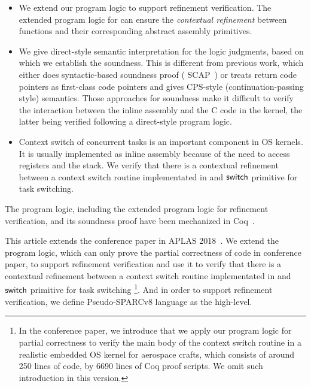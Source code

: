 \begin{itemize}
    \item
    We extend our program logic 
    to support refinement verification. 
    The extended program logic for \sparc{} can ensure 
    the {\it contextual refinement} between
    \sparc{} functions and their corresponding 
    abstract assembly primitives. 

    \item
    We give direct-style semantic interpretation for
    the logic judgments, based on which we establish the
    soundness. This is different from previous
    work, which either does syntactic-based soundness proof
    (\eg{} SCAP~\cite{Feng06pldi}) or treats return code pointers
    as first-class code pointers and gives CPS-style 
    (continuation-passing style) semantics.
    Those approaches for soundness make it difficult to verify
    the interaction between the inline assembly and the C
    code in the kernel, the latter being verified following
    a direct-style program logic.

    \item
	Context switch of concurrent tasks is an important
    component in OS kernels. It is usually implemented
    as inline assembly because of the need to access
    registers and the stack. 
    We verify that there is a contextual refinement 
    between a context switch routine implementated 
    in \sparc{} and $\mathsf{switch}$ primitive for task 
    switching. 


\end{itemize}
The program logic, including the extended program logic 
for refinement verification, and its soundness proof 
have been mechanized in Coq~\cite{coqimp}. 

This article extends the conference paper in 
APLAS 2018~\cite{zha18aplas}. We extend 
the program logic, which can only prove the partial 
correctness of \sparc{} code in conference paper, 
to support refinement verification and use it to  
verify that there is a contextual refinement between 
a context switch routine implementated 
in \sparc{} and $\mathsf{switch}$ primitive for task switching
\footnote{In the conference paper, 
    we introduce that we apply our program logic 
    for partial correctness to 
    verify the main body of the context switch routine
	in a realistic embedded OS kernel for aerospace crafts,
    which consists of around 250 lines of \sparc{} code, 
    by 6690 lines of Coq proof scripts. 
    We omit such introduction in this version.}. 
And in order to support refinement verification, 
we define Pseudo-SPARCv8 language as the high-level.

